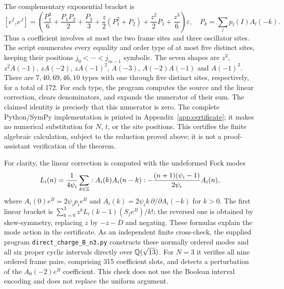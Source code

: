 \documentclass[11pt,a4paper]{article}
\numberwithin{equation}{section}
\theoremstyle{definition}\newtheorem{definition}[theorem]{Definition}
\theoremstyle{remark}\newtheorem{remark}[theorem]{Remark}
\begin{document}
The complementary exponential bracket is
\[
 [e^I{}_{z}e^J]=
 \left(\frac{P_1^3}{6}+\frac{P_1P_2}{2}+\frac{P_3}{3}
       +\frac z2(P_1^2+P_2)+\frac{z^2}2P_1+\frac{z^3}{6}\right)\varepsilon,
 \quad P_k=\sum_l p_l(I)A_l(-k).
\]
Thus a coefficient involves at most the two frame sites and three oscillator sites. The script enumerates every equality and order type of at most five distinct sites, keeping their positions $j_0<\cdots<j_{m-1}$ symbolic. The seven shapes are $z^3$, $z^2A(-1)$, $zA(-2)$, $zA(-1)^2$, $A(-3)$, $A(-2)A(-1)$ and $A(-1)^3$. There are $7,40,69,46,10$ types with one through five distinct sites,
respectively, for a total of 172. For each type, the program computes
the source and the linear correction, clears denominators, and expands
the numerator of their sum. The claimed identity is precisely that
this numerator is zero. The complete Python/SymPy implementation is
printed in Appendix~\ref{app:certificate}; it makes no numerical
substitution for $N$, $t$, or the site positions. This certifies the
finite algebraic calculation, subject to the reduction proved above;
it is not a proof-assistant verification of the theorem.

For clarity, the linear correction is computed with the undeformed
Fock modes
\[
 L_i(n)=\frac1{4\psi_i}\sum_{k\in\mathbb Z}:A_i(k)A_i(n-k):
 -\frac{(n+1)(\psi_i-1)}{2\psi_i}A_i(n),
\]
where $A_i(0)e^B=2\psi_ip_i e^B$ and
$A_i(k)=2\psi_i k\,\partial/\partial A_i(-k)$ for $k>0$.
The first linear bracket is
$\sum_{k=0}^3 z^k L_i(k-1)(S_je^B)/k!$; the reversed one is
obtained by skew-symmetry, replacing $z$ by $-z-D$ and negating.
These formulas explain the mode action in the certificate.
As an independent finite cross-check, the supplied program
\nolinkurl{direct_charge_B_n3.py} constructs these normally ordered
modes and all six proper cyclic intervals directly over
$\mathbb Q(\sqrt{13})$. For $N=3$ it verifies all nine ordered frame pairs,
comprising 315 coefficient slots, and detects a perturbation of the
$A_0(-2)e^B$ coefficient. This check does not use the Boolean
interval encoding and does not replace the uniform argument.
\end{document}
